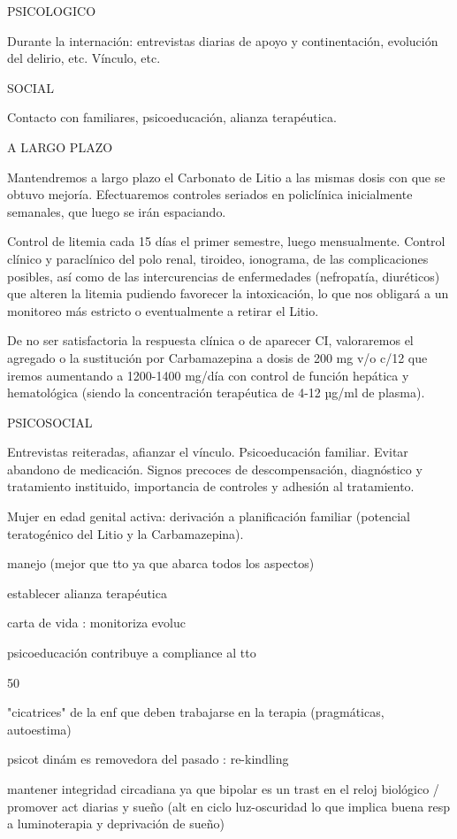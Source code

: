 \documentclass{scrbook}
\begin{document}
PSICOLOGICO

Durante la internación: entrevistas diarias de apoyo y continentación, evolución del delirio, etc. Vínculo, etc.

SOCIAL

Contacto con familiares, psicoeducación, alianza terapéutica.

A LARGO PLAZO

Mantendremos a largo plazo el Carbonato de Litio a las mismas dosis con que se obtuvo mejoría. Efectuaremos controles seriados en policlínica inicialmente semanales, que luego se irán espaciando.

Control de litemia cada 15 días el primer semestre, luego mensualmente. Control clínico y paraclínico del polo renal, tiroideo, ionograma, de las complicaciones posibles, así como de las intercurencias de enfermedades (nefropatía, diuréticos) que alteren la litemia pudiendo favorecer la intoxicación, lo que nos obligará a un monitoreo más estricto o eventualmente a retirar el Litio.

De no ser satisfactoria la respuesta clínica o de aparecer CI, valoraremos el agregado o la sustitución por Carbamazepina a dosis de 200 mg v/o c/12 que iremos aumentando a 1200-1400 mg/día con control de función hepática y hematológica (siendo la concentración terapéutica de 4-12 µg/ml de plasma).

PSICOSOCIAL

Entrevistas reiteradas, afianzar el vínculo. Psicoeducación familiar. Evitar abandono de medicación. Signos precoces de descompensación, diagnóstico y tratamiento instituido, importancia de controles y adhesión al tratamiento.

Mujer en edad genital activa: derivación a planificación familiar (potencial teratogénico del Litio y la Carbamazepina).

manejo (mejor que tto ya que abarca todos los aspectos)

establecer alianza terapéutica

carta de vida : monitoriza evoluc

psicoeducación contribuye a compliance al tto

50 %

"cicatrices" de la enf que deben trabajarse en la terapia (pragmáticas, autoestima)

psicot dinám es removedora del pasado : re-kindling

mantener integridad circadiana ya que bipolar es un trast en el reloj biológico / promover act diarias y sueño (alt en ciclo luz-oscuridad lo que implica buena resp a luminoterapia y deprivación de sueño)
\end{document}
